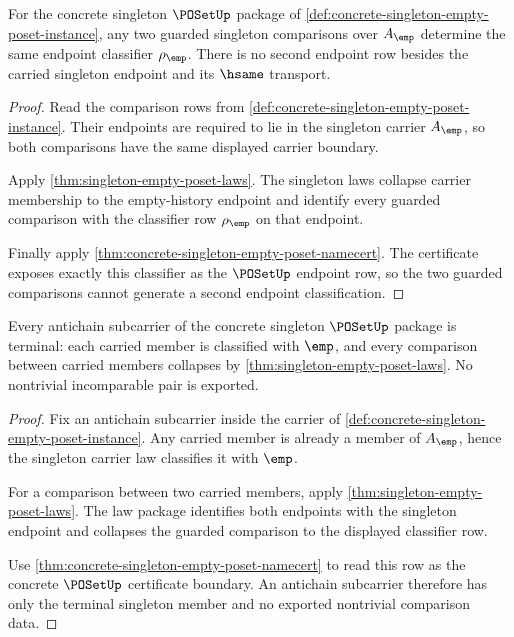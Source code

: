\begin{theorem}
\label{thm:poset-singleton-comparison-endpoint-determinacy}
For the concrete singleton $\POSetUp$ package of
\autoref{def:concrete-singleton-empty-poset-instance}, any two guarded
singleton comparisons over $A_{\emp}$ determine the same endpoint classifier
$\rho_{\emp}$. There is no second endpoint row besides the carried singleton
endpoint and its $\hsame$ transport.
\end{theorem}
\begin{proof}
Read the comparison rows from
\autoref{def:concrete-singleton-empty-poset-instance}. Their endpoints are
required to lie in the singleton carrier $A_{\emp}$, so both comparisons have
the same displayed carrier boundary.

Apply \autoref{thm:singleton-empty-poset-laws}. The singleton laws collapse
carrier membership to the empty-history endpoint and identify every guarded
comparison with the classifier row $\rho_{\emp}$ on that endpoint.

Finally apply \autoref{thm:concrete-singleton-empty-poset-namecert}. The
certificate exposes exactly this classifier as the $\POSetUp$ endpoint row,
so the two guarded comparisons cannot generate a second endpoint
classification.
\end{proof}

\begin{theorem}
\label{thm:poset-singleton-antichain-terminality}
Every antichain subcarrier of the concrete singleton $\POSetUp$ package is
terminal: each carried member is classified with $\emp$, and every comparison
between carried members collapses by
\autoref{thm:singleton-empty-poset-laws}. No nontrivial incomparable pair is
exported.
\end{theorem}
\begin{proof}
Fix an antichain subcarrier inside the carrier of
\autoref{def:concrete-singleton-empty-poset-instance}. Any carried member is
already a member of $A_{\emp}$, hence the singleton carrier law classifies it
with $\emp$.

For a comparison between two carried members, apply
\autoref{thm:singleton-empty-poset-laws}. The law package identifies both
endpoints with the singleton endpoint and collapses the guarded comparison to
the displayed classifier row.

Use \autoref{thm:concrete-singleton-empty-poset-namecert} to read this row as
the concrete $\POSetUp$ certificate boundary. An antichain subcarrier
therefore has only the terminal singleton member and no exported nontrivial
comparison data.
\end{proof}

